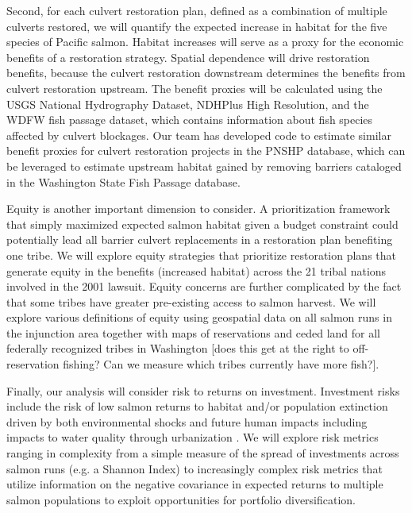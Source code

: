 \documentclass[12pt]{elsarticle}
\begin{document}
Second, for each culvert restoration plan, defined as a combination of multiple culverts restored, we will quantify the expected increase in habitat for the five species of Pacific salmon. Habitat increases will serve as a proxy for the economic benefits of a restoration strategy. Spatial dependence will drive restoration benefits, because the culvert restoration downstream determines the benefits from culvert restoration upstream. The benefit proxies will be calculated using the USGS National Hydrography Dataset, NDHPlus High Resolution, and the WDFW fish passage dataset, which contains information about fish species affected by culvert blockages.  Our team has developed code to estimate similar benefit proxies for culvert restoration projects in the PNSHP database, which can be leveraged to estimate upstream habitat gained by removing barriers cataloged in the Washington State Fish Passage database. 

%
Equity is another important dimension to consider. A prioritization framework that simply maximized expected salmon habitat given a budget constraint could potentially lead all barrier culvert replacements in a restoration plan benefiting one tribe. We will explore equity strategies that prioritize restoration plans that generate equity in the benefits (increased habitat) across the 21 tribal nations involved in the 2001 lawsuit. Equity concerns are further complicated by the fact that some tribes have greater pre-existing access to salmon harvest. We will explore various definitions of equity using geospatial data on all salmon runs in the injunction area together with maps of reservations and ceded land for all federally recognized tribes in Washington [does this get at the right to off-reservation fishing? Can we measure which tribes currently have more fish?]. 

%
Finally, our analysis will consider risk to returns on investment. Investment risks include the risk of low salmon returns to habitat and/or population extinction driven by both environmental shocks and future human impacts including impacts to water quality through urbanization \citep{ettinger2021prioritizing}. We will explore risk metrics ranging in complexity from a simple measure of the spread of investments across salmon runs (e.g. a Shannon Index) to increasingly complex risk metrics that utilize information on the negative covariance in expected returns to multiple salmon populations to exploit opportunities for portfolio diversification.  
\end{document}
